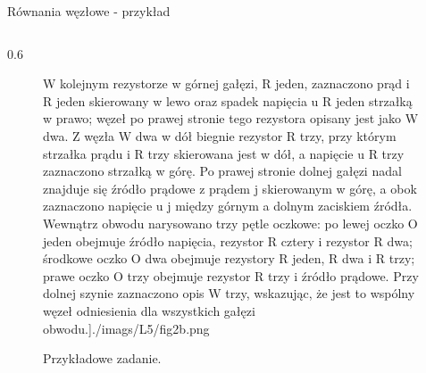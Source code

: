\begin{frame}{Równania węzłowe - przykład}
\begin{columns}
\begin{column}{0.6\textwidth}
\begin{figure}
{							W kolejnym rezystorze w górnej gałęzi, R jeden, zaznaczono prąd i R jeden skierowany w lewo oraz spadek napięcia u R jeden strzałką w prawo; węzeł po prawej stronie tego rezystora opisany jest jako W dwa.
							Z węzła W dwa w dół biegnie rezystor R trzy, przy którym strzałka prądu i R trzy skierowana jest w dół, a napięcie u R trzy zaznaczono strzałką w górę.
							Po prawej stronie dolnej gałęzi nadal znajduje się źródło prądowe z prądem j skierowanym w górę, a obok zaznaczono napięcie u j między górnym a dolnym zaciskiem źródła.
							Wewnątrz obwodu narysowano trzy pętle oczkowe: po lewej oczko O jeden obejmuje źródło napięcia, rezystor R cztery i rezystor R dwa; środkowe oczko O dwa obejmuje rezystory R jeden, R dwa i R trzy; prawe oczko O trzy obejmuje rezystor R trzy i źródło prądowe.
							Przy dolnej szynie zaznaczono opis W trzy, wskazując, że jest to wspólny węzeł odniesienia dla wszystkich gałęzi obwodu.}]{./imags/L5/fig2b.png}
				\caption{Przykładowe zadanie.}
			\end{figure}
		\end{column}
	\end{columns}
\end{frame}

